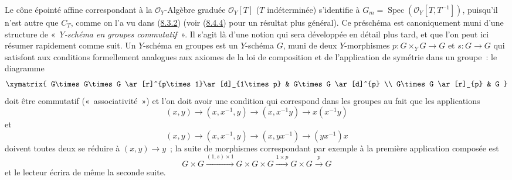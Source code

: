 \begin{remark}[8.3.9]
\label{II.8.3.9-fr}
Le cône épointé affine correspondant à la $\mathcal{O}_Y$-Algèbre graduée
$\mathcal{O}_Y[T]$ ($T$ indéterminée) s'identifie à
$G_m=\operatorname{Spec}(\mathcal{O}_Y[T,T^{-1}])$, puisqu'il n'est autre que
$C_T$, comme on l'a vu dans (\hyperref[II.8.3.2-fr]{8.3.2}) (voir
(\hyperref[II.8.4.4-fr]{8.4.4}) pour un résultat plus général). Ce préschéma
est canoniquement muni d'une structure de «~\emph{$Y$-schéma en groupes
commutatif}~». Il s'agit là d'une notion qui sera développée en détail plus
tard, et que l'on peut ici résumer rapidement comme suit. Un $Y$-schéma en
groupes est un $Y$-schéma $G$, muni de deux $Y$-morphismes
$p:G\times_YG\to G$ et $s:G\to G$ qui satisfont aux conditions formellement
analogues aux axiomes de la loi de composition et de l'application de
symétrie dans un groupe~: le diagramme
\[
  \xymatrix{
    G\times G\times G \ar[r]^{p\times1}\ar[d]_{1\times p}
      & G\times G \ar[d]^{p} \\
    G\times G \ar[r]_{p} & G
  }
\]
doit être commutatif («~associativité~») et l'on doit avoir une condition qui
correspond dans les groupes au fait que les applications
\[
  (x,y)\to(x,x^{-1},y)\to(x,x^{-1}y)\to x(x^{-1}y)
\]
et
\[
  (x,y)\to(x,x^{-1},y)\to(x,yx^{-1})\to(yx^{-1})x
\]
doivent toutes deux se réduire à $(x,y)\to y$~; la suite de morphismes
correspondant par exemple à la première application composée est
\[
  G\times G\xrightarrow{(1,s)\times1}G\times G\times G
  \xrightarrow{1\times p}G\times G\xrightarrow{p}G
\]
et le lecteur écrira de même la seconde suite.


\end{remark}
